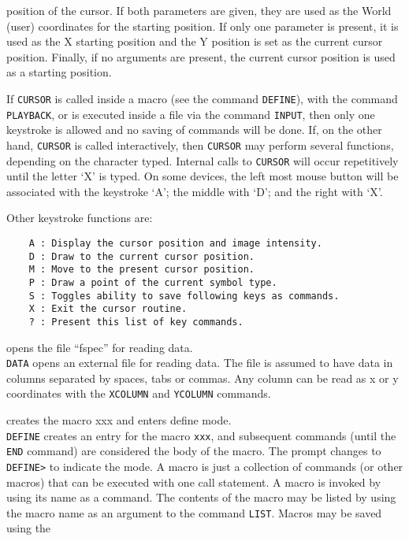 	position of the cursor.  If both parameters are given, they are
	used as the World (user) coordinates for the starting
	position.  If only one parameter is present, it is used as the
	X starting position and the Y position is set as the current
	cursor position.  Finally, if no arguments are present, the
	current cursor position is used as a starting position.
	\par 
	If {\tt CURSOR} is called inside a macro (see the command
	{\tt DEFINE}), with the command
	{\tt PLAYBACK}, or is executed inside
	a file via the command {\tt INPUT}, then
	only one keystroke is allowed and no saving of commands will be
	done.  If, on the other hand, {\tt CURSOR} is called
	interactively, then {\tt CURSOR} may perform several
	functions, depending on the character typed.  Internal calls to
	{\tt CURSOR} will occur repetitively until the letter `X'
	is typed.  On some devices, the left most mouse button will be
	associated with the keystroke `A'; the middle with `D'; and the
	right with `X'.
	\par 
	Other keystroke functions are:
	\begin{verbatim}
    A : Display the cursor position and image intensity.
    D : Draw to the current cursor position.
    M : Move to the present cursor position.
    P : Draw a point of the current symbol type.
    S : Toggles ability to save following keys as commands.
    X : Exit the cursor routine.
    ? : Present this list of key commands.
	\end{verbatim}
\item [{\tt DATA fspec } --] opens the file ``fspec'' for reading data.\\
	{\tt DATA} opens an external file for reading data.  The
	file is assumed to have data in columns separated by spaces,
	tabs or commas.  Any column can be read as x or y coordinates
	with the {\tt XCOLUMN} and
	{\tt YCOLUMN} commands.
\item [{\tt DEFINE xxx } --] creates the macro xxx and enters define mode.\\
	{\tt DEFINE} creates an entry for the macro {\tt xxx},
	and subsequent commands (until the {\tt END}
	command) are considered the body of the macro.  The prompt changes
	to {\tt DEFINE}\verb+>+ to indicate the mode.  A macro is just
	a collection of commands (or other macros) that can be executed
	with one call statement.  A macro is invoked by using its name as
	a command.  The contents of the macro may be listed by using the
	macro name as an argument to the command
	{\tt LIST}.  Macros may be saved using the
